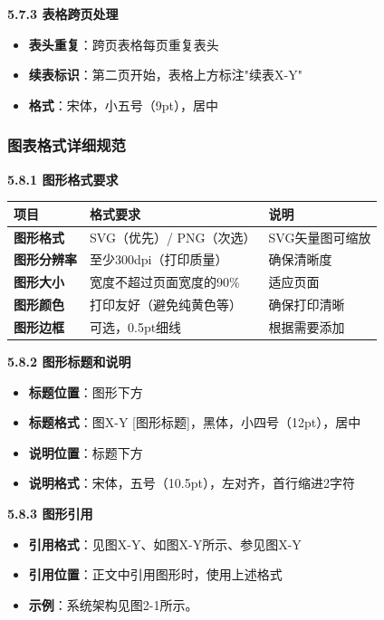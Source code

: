 \documentclass[12pt,a4paper]{article}
\numberwithin{equation}{section}  %
\begin{document}
\textbf{5.7.3 表格跨页处理}

\begin{itemize}
\item \textbf{表头重复}：跨页表格每页重复表头
\item \textbf{续表标识}：第二页开始，表格上方标注"续表X-Y"
\item \textbf{格式}：宋体，小五号（9pt），居中
\end{itemize}

\subsubsection{图表格式详细规范}
\textbf{5.8.1 图形格式要求}

\begin{longtable}{|p{4cm}|p{5cm}|p{5cm}|}
\hline
项目 & 格式要求 & 说明 \\
\hline
\textbf{图形格式} & SVG（优先）/ PNG（次选） & SVG矢量图可缩放 \\
\textbf{图形分辨率} & 至少300dpi（打印质量） & 确保清晰度 \\
\textbf{图形大小} & 宽度不超过页面宽度的90\% & 适应页面 \\
\textbf{图形颜色} & 打印友好（避免纯黄色等） & 确保打印清晰 \\
\textbf{图形边框} & 可选，0.5pt细线 & 根据需要添加 \\
\hline
\end{longtable}

\textbf{5.8.2 图形标题和说明}

\begin{itemize}
\item \textbf{标题位置}：图形下方
\item \textbf{标题格式}：{\ttfamily 图X-Y [图形标题]}，黑体，小四号（12pt），居中
\item \textbf{说明位置}：标题下方
\item \textbf{说明格式}：宋体，五号（10.5pt），左对齐，首行缩进2字符
\end{itemize}

\textbf{5.8.3 图形引用}

\begin{itemize}
\item \textbf{引用格式}：{\ttfamily 见图X-Y}、{\ttfamily 如图X-Y所示}、{\ttfamily 参见图X-Y}
\item \textbf{引用位置}：正文中引用图形时，使用上述格式
\item \textbf{示例}：{\ttfamily 系统架构见图2-1所示。}
\end{itemize}
\end{document}
